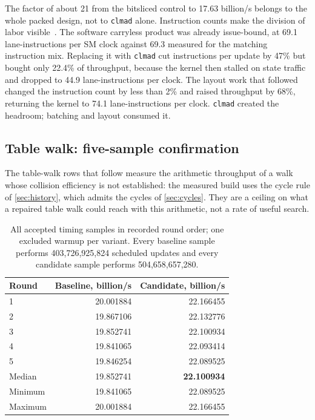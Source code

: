 \documentclass[11pt,a4paper]{article}
\newcommand{\code}[1]{\texttt{\small #1}}
\begin{document}
The factor of about 21 from the bitsliced control to 17.63 billion/s belongs to the whole packed design, not to \code{clmad} alone. Instruction counts make the division of labor visible~\cite{throughput30}. The software carryless product was already issue-bound, at 69.1 lane-instructions per SM clock against 69.3 measured for the matching instruction mix. Replacing it with \code{clmad} cut instructions per update by 47\% but bought only 22.4\% of throughput, because the kernel then stalled on state traffic and dropped to 44.9 lane-instructions per clock. The layout work that followed changed the instruction count by less than 2\% and raised throughput by 68\%, returning the kernel to 74.1 lane-instructions per clock. \code{clmad} created the headroom; batching and layout consumed it.

\subsection{Table walk: five-sample confirmation}
The table-walk rows that follow measure the arithmetic throughput of a walk whose collision efficiency is not established: the measured build uses the cycle rule of \cref{sec:history}, which admits the cycles of \cref{sec:cycles}. They are a ceiling on what a repaired table walk could reach with this arithmetic, not a rate of useful search.

\begin{table}[t]
\centering
\begin{tabular}{@{}lrr@{}}
\toprule
Round & Baseline, billion/s & Candidate, billion/s\\
\midrule
1 & 20.001884 & 22.166455\\
2 & 19.867106 & 22.132776\\
3 & 19.852741 & 22.100934\\
4 & 19.841065 & 22.093414\\
5 & 19.846254 & 22.089525\\
\midrule
Median & 19.852741 & \textbf{22.100934}\\
Minimum & 19.841065 & 22.089525\\
Maximum & 20.001884 & 22.166455\\
\bottomrule
\end{tabular}
\caption{All accepted timing samples in recorded round order; one excluded warmup per variant. Every baseline sample performs 403,726,925,824 scheduled updates and every candidate sample performs 504,658,657,280.}
\label{tab:timings}
\end{table}
\end{document}
